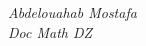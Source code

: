 \documentclass[print]{docmathdz}
\begin{document}
\bigskip\noindent\emph{Abdelouahab Mostafa}\\
\emph{Doc Math DZ}





\end{document}
